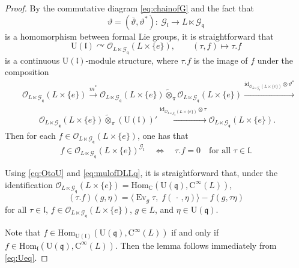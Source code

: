 \documentclass[12pt, a4paper]{amsart}
\newcommand{\BC}{{\mathbb {C}}}
\newcommand{\CG}{{\mathcal {G}}}
\newcommand{\CO}{{\mathcal {O}}}
\newcommand{\RC}{{\mathrm {C}}}
\newcommand{\RU}{{\mathrm {U}}}
\newcommand{\Hom}{{\mathrm{Hom}}}
\newcommand{\wt}{\widetilde}
\newcommand{\Ev}{\operatorname{Ev}}
\newcommand{\q}{\mathfrak q}
\renewcommand{\l}{\mathfrak l}
\newcommand{\be}{\begin {equation}}
\newcommand{\ee}{\end {equation}}
\theoremstyle{Theorem}
\theoremstyle{Theorem}
\theoremstyle{Theorem}
\theoremstyle{Theorem}
\theoremstyle{Plain}
\theoremstyle{remark}
\theoremstyle{remark}
\theoremstyle{Definition}
\numberwithin{equation}{section}
\begin{document}
\begin{proof}
By the commutative diagram \eqref{eq:chainofG} and the fact that
\[
\vartheta=(\overline{\vartheta},\vartheta^*):\ \CG_{\l}\rightarrow L\ltimes \CG_{\q}
\]
is a homomorphism between formal Lie groups, it is straightforward that
\[
\RU(\l)\curvearrowright \CO_{L\ltimes \CG_{\q}}(L\times \{e\}),\qquad 
(\tau,f)\mapsto \tau.f
\]
is a continuous $\RU(\l)$-module structure, where $\tau.f$ is the image of $f$ under the composition
\be \label{eq:OtoU}
\begin{aligned}
&\CO_{L\ltimes \CG_{\q}}(L\times \{e\})
\xrightarrow{m^*} 
\CO_{L\ltimes \CG_{\q}}(L\times \{e\}) \wt\otimes_{\pi} \CO_{L\ltimes \CG_{\q}}(L\times \{e\})  
\xrightarrow{\mathrm{id}_{\CO_{L\ltimes \CG_{\q}}(L\times \{e\})}\otimes \vartheta^*} \\
&\qquad \CO_{L\ltimes \CG_{\q}}(L\times \{e\}) \wt\otimes_{\pi} (\RU(\l))' 
\xrightarrow{\mathrm{id}_{\CO_{L\ltimes \CG_{\q}}(L\times \{e\})}\otimes \tau}
\CO_{L\ltimes \CG_{\q}}(L\times \{e\}).
\end{aligned}
\ee
Then for each $f\in \CO_{L\ltimes \CG_{\q}}(L\times \{e\})$, one has that
\[
f\in \CO_{L\ltimes \CG_{\q}}(L\times \{e\})^{\CG_{\l}}
\quad\Longleftrightarrow\quad
\tau.f=0\quad\text{for all }\tau\in \l.
\]

Using \eqref{eq:OtoU} and \eqref{eq:mulofDLLq}, it is straightforward that, under the identification $\CO_{L\ltimes \CG_{\q}}(L\times \{e\})=\Hom_{\BC}(\RU(\q),\RC^{\infty}(L))$,
\be\label{eq:tauonf}
(\tau.f)(g,\eta)=
\bigl\langle \Ev_g\tau,\; f(\,\cdot\,,\eta) \bigr\rangle - f(g,\tau\eta)
\ee
for all $\tau\in\l$, $f\in \CO_{L\ltimes \CG_{\q}}(L\times \{e\})$, $g\in L$, and $\eta\in \RU(\q)$.

Note that $f\in \Hom_{\RU(\l)}(\RU(\q), \RC^{\infty}(L))$ if and only if $f\in \Hom_{\l}(\RU(\q), \RC^{\infty}(L))$. Then the lemma follows immediately from \eqref{eq:Ueq}.
\end{proof}


\end{document}
